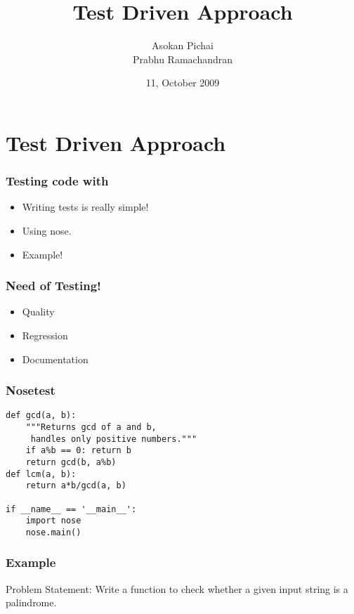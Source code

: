 \documentclass[compress,14pt]{beamer}
\title[]{Test Driven Approach}
\author[FOSSEE Team] {Asokan Pichai\\Prabhu Ramachandran}
\institute[IIT Bombay] {Department of Aerospace Engineering\\IIT Bombay}
\date[] {11, October 2009}
\date[] %
\newcounter{time}
\newcommand{\inctime}[1]{\addtocounter{time}{#1}{\vspace*{0.1in}\tiny \thetime\ m}}
\begin{document}
\begin{frame}
  \maketitle
\end{frame}

\section{Test Driven Approach}

\begin{frame}
    \frametitle{Testing code with }
   
    \begin{itemize}
        \item Writing tests is really simple!

        \item Using nose.

        \item Example!
    \end{itemize}
\end{frame}

\begin{frame}
    \frametitle{Need of Testing!}
   
    \begin{itemize}
        \item Quality

        \item Regression

        \item Documentation
    \end{itemize}
\end{frame}

\begin{frame}[fragile]
    \frametitle{Nosetest}
  \begin{lstlisting}
def gcd(a, b):
    """Returns gcd of a and b, 
     handles only positive numbers."""
    if a%b == 0: return b
    return gcd(b, a%b)
def lcm(a, b):
    return a*b/gcd(a, b)

if __name__ == '__main__':
    import nose
    nose.main()
  \end{lstlisting}
\inctime{10}
\end{frame}

\begin{frame}[fragile]
    \frametitle{Example}
    \begin{block}{Problem Statement:}
      Write a function to check whether a given input
      string is a palindrome.
    \end{block}
\end{frame}
\end{document}
